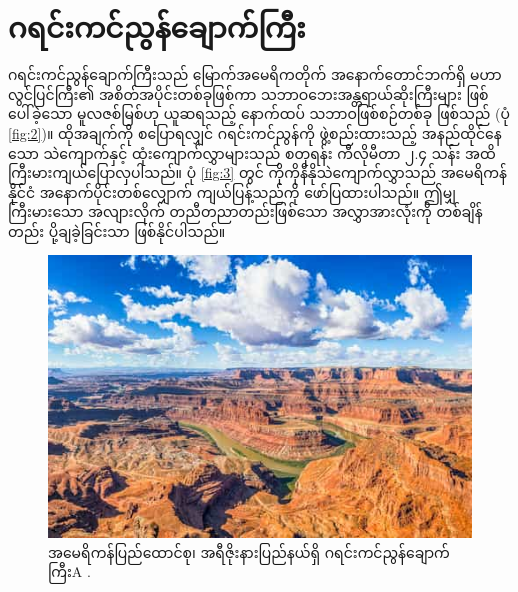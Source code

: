 \documentclass[10pt,twocolumn,letterpaper]{article}
\begin{document}
\section{ဂရင်းကင်ညွန်ချောက်ကြီး}

ဂရင်းကင်ညွန်ချောက်ကြီးသည် မြောက်အမေရိကတိုက် အနောက်တောင်ဘက်ရှိ မဟာလွင်ပြင်ကြီး၏ အစိတ်အပိုင်းတစ်ခုဖြစ်ကာ သဘာဝဘေးအန္တရာယ်ဆိုးကြီးများ ဖြစ်ပေါ်ခဲ့သော မူလဇစ်မြစ်ဟု ယူဆရသည့် နောက်ထပ် သဘာဝဖြစ်စဉ်တစ်ခု ဖြစ်သည် (ပုံ \ref{fig:2})။ ထိုအချက်ကို စပြောရလျှင် ဂရင်းကင်ညွန်ကို ဖွဲ့စည်းထားသည့် အနည်ထိုင်နေသော သဲကျောက်နှင့် ထုံးကျောက်လွှာများသည် စတုရန်း ကီလိုမီတာ ၂.၄ သန်း အထိ ကြီးမားကျယ်ပြောလှပါသည်။ ပုံ \ref{fig:3} တွင် ကိုကိုနီနိုသဲကျောက်လွှာသည် အမေရိကန်နိုင်ငံ အနောက်ပိုင်းတစ်လျှောက် ကျယ်ပြန့်သည်ကို ဖော်ပြထားပါသည်။ ဤမျှကြီးမားသော အလျားလိုက် တညီတညာတည်းဖြစ်သော အလွှာအားလုံးကို တစ်ချိန်တည်း ပို့ချခဲ့ခြင်းသာ ဖြစ်နိုင်ပါသည်။

\begin{figure}[b]
\begin{center}
   \includegraphics[width=1\linewidth]{grand-canyon.jpg}
\end{center}
   \caption{အမေရိကန်ပြည်ထောင်စု၊ အရီဇိုးနားပြည်နယ်ရှိ ဂရင်းကင်ညွန်ချောက်ကြီးA \cite{49}.}
\label{fig:2}
\label{fig:onecol}
\end{figure}
\end{document}
